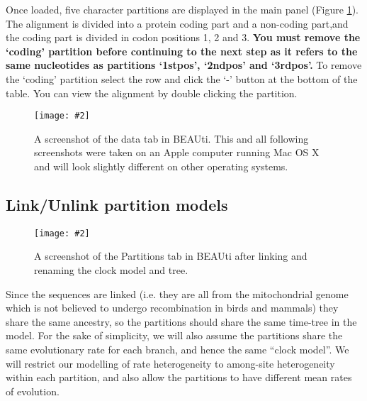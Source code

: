 \documentclass[11pt]{article}
\theoremstyle{plain}%
\theoremstyle{definition}
\theoremstyle{remark}
\newcommand{\includeimage}[2][]{%
\texttt{[image: \#2]}
}
\begin{document}
Once loaded, five character partitions are displayed in the main panel (Figure \ref{fig:BEAUTI_DataPartitions}). The alignment is divided into a protein coding part and a non-coding part,and the coding part is divided in codon positions 1, 2 and 3. 
{\bf You must remove the `coding' partition before continuing to the next step as it refers to the same nucleotides as partitions `1stpos', `2ndpos' and `3rdpos'.} To remove the `coding' partition select the row and click the `-' button at the bottom of the table. 
You can view the alignment by double clicking the partition.

\begin{figure}
\centering	
\includeimage[width=0.9\textwidth]{figures/BEAUti_DataPartitions}
\label{fig:BEAUTI_DataPartitions}
\caption{A screenshot of the data tab in BEAUti. This and all following screenshots
were taken on an Apple computer running Mac OS X and will look slightly different on other operating systems.}
\end{figure}

%
%

\subsection*{Link/Unlink partition models}

\begin{figure}
\centering	
\includeimage[width=0.9\textwidth]{figures/BEAUti_DataPartitions_final}
\label{fig:BEAUti_DataPartitions_final}
\caption{A screenshot of the Partitions tab in BEAUti after linking and renaming the clock model and tree.}
\end{figure}

Since the sequences are linked (i.e. they are all from the mitochondrial genome
which is not believed to undergo recombination in birds and mammals) they
share the same ancestry, so the partitions should share the same time-tree in
the model. For the sake of simplicity, we will also assume the partitions share
the same evolutionary rate for each branch, and hence the same ``clock model''.
We will restrict our modelling of rate heterogeneity to among-site heterogeneity
within each partition, and also allow the partitions to have different mean rates of evolution. 
\end{document}
